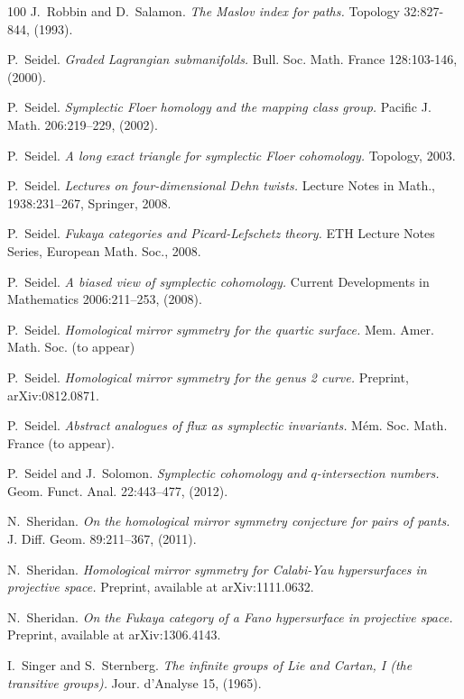 \documentclass[11pt,a4paper]{article}
\numberwithin{equation}{section}
\begin{document}
\begin{thebibliography}{100}
J.~Robbin and D.~Salamon.
\emph{The Maslov index for paths.}
Topology 32:827-844, (1993).

P.~Seidel.
\emph{Graded Lagrangian submanifolds.}
Bull. Soc. Math. France 128:103-146, (2000).

P.~Seidel.
\emph{Symplectic Floer homology and the mapping class group.}
Pacific J. Math. 206:219--229, (2002).

P.~Seidel.
\emph{A long exact triangle for symplectic Floer cohomology.}
Topology, 2003.

P.~Seidel.
\emph{Lectures on four-dimensional Dehn twists.}
Lecture Notes in Math., 1938:231--267, Springer, 2008.

P.~Seidel.
\emph{Fukaya categories and Picard-Lefschetz theory.}
ETH Lecture Notes Series, European Math. Soc., 2008.

P.~Seidel.
\emph{A biased view of symplectic cohomology.}
Current Developments in Mathematics 2006:211--253, (2008).

P.~Seidel.
\emph{Homological mirror symmetry for the quartic surface.}
Mem. Amer. Math. Soc. (to appear)

P.~Seidel.
\emph{Homological mirror symmetry for the genus 2 curve.}
Preprint, arXiv:0812.0871.

P.~Seidel.
\emph{Abstract analogues of flux as symplectic invariants.}
M\'em. Soc. Math. France (to appear).

P.~Seidel and J.~Solomon.
\emph{Symplectic cohomology and $q$-intersection numbers.}
Geom. Funct. Anal. 22:443--477, (2012).

N.~Sheridan.
\emph{On the homological mirror symmetry conjecture for pairs of pants.}
J. Diff. Geom. 89:211--367, (2011).

N.~Sheridan.
\emph{Homological mirror symmetry for Calabi-Yau hypersurfaces in projective space.}
Preprint, available at arXiv:1111.0632.

N.~Sheridan.
\emph{On the Fukaya category of a Fano hypersurface in projective space.}
Preprint, available at arXiv:1306.4143.

I.~Singer and S.~Sternberg.
\emph{The infinite groups of Lie and Cartan, I (the transitive groups).}
Jour. d'Analyse 15, (1965).


\end{thebibliography}
\end{document}
